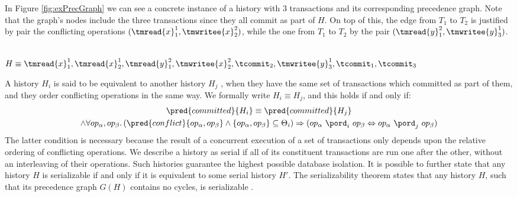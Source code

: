In Figure \ref{fig:exPrecGraph} we can see a concrete instance of a history with $3$ transactions and its corresponding precedence graph. Note that the graph's nodes include the three transactions since they all commit as part of $H$. On top of this, the edge from $T_1$ to $T_2$ is justified by pair the conflicting operations $(\tmread{x}_1^1, \tmwritee{x}_2^2)$, while the one from $T_1$ to $T_2$ by the pair $(\tmread{y}_1^2, \tmwritee{y}_3^1)$.

\begin{center}
\\[0.4em]
$H \equiv \tmread{x}_1^1, \tmread{x}_2^1, \tmread{y}_1^2, \tmwritee{x}_2^2, \tcommit_2, \tmwritee{y}_3^1, \tcommit_1, \tcommit_3$
\label{fig:exPrecGraph}
\end{center}

A history $H_i$ is said to be equivalent to another history $H_j$ \cite{ccontrol}, when they have the same set of transactions which committed as part of them, and they order conflicting operations in the same way. We formally write $H_i \equiv H_j$, and this holds if and only if:
\begin{gather*}
	\pred{committed}{H_i} \equiv \pred{committed}{H_j} \\
	\land \forall op_\alpha, op_\beta \ldotp (\pred{conflict}{op_\alpha, op_\beta} \land \left\lbrace op_\alpha, op_\beta \right\rbrace \subseteq \Theta_i) \Rightarrow (op_\alpha\ \pord_i\ op_\beta \Leftrightarrow op_\alpha\ \pord_j\ op_\beta)
\end{gather*}
The latter condition is necessary because the result of a concurrent execution of a set of transactions only depends upon the relative ordering of conflicting operations. We describe a history as serial if all of its constituent transactions are run one after the other, without an interleaving of their operations. Such histories guarantee the highest possible database isolation. It is possible to further state that any history $H$ is serializable if and only if it is equivalent to some serial history $H'$. The serializability theorem states that any history $H$, such that its precedence graph $G(H)$ contains no cycles, is serializable \cite{ccontrol}.

